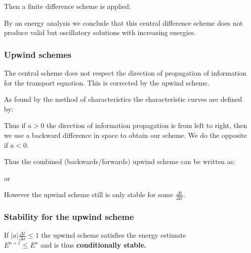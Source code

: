 \documentclass[8pt,a4paper]{scrartcl}
\begin{document}
\begin{multicols*}{3}
Then a finite difference scheme is applied:


By an energy analysis we conclude that this central difference scheme does not produce valid but oscillatory solutions with increasing energies.

\subsubsection*{Upwind schemes}

The central scheme does not respect the direction of propagation of information for the transport equation. This is corrected by the upwind scheme.

As found by the method of characteristics the characteristic curves are defined by:
 

Thus if $a>0$ the direction of information propagation is from left to right, then we use a backward difference in space to obtain our scheme. We do the opposite if $a<0$.


Thus the combined (backwards/forwards) upwind scheme can be written as:


or


However the upwind scheme still is only stable for some $\frac{\Delta t}{\Delta x}.$

\subsubsection*{Stability for the upwind scheme}

If $|a|\frac{\Delta t}{\Delta x}\leq 1$ the upwind scheme satisfies the energy estimate \\ $E^{n+1}\leq E^n$ and is thus \textbf{conditionally stable.}

\end{multicols*}
\end{document}
